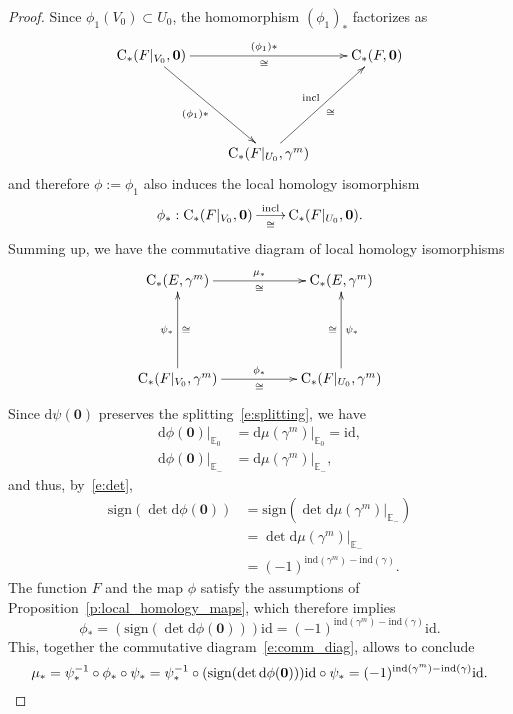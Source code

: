 \documentclass[reqno]{amsart}
\numberwithin{equation}{section}
\theoremstyle{personal}%
\theoremstyle{definition}
\newcommand{\E}{\mathds{E}}
\newcommand{\diff}{\mathrm{d}}
\newcommand{\incl}{\mathrm{incl}}
\newcommand{\Loc}{\mathrm{C}}
\newcommand{\ind}{\mathrm{ind}}
\DeclareRobustCommand{\llongrightarrow}{\relbar\joinrel\relbar\joinrel\rightarrow}
\DeclareMathOperator*{\ttoup}{\llongrightarrow}
\begin{document}
\begin{proof}
Since $\phi_1(V_0)\subset U_0$, the homomorphism $(\phi_1)_*$ factorizes as 
\begin{align*}
\xymatrix{
\Loc_*(F|_{V_0},\bm0)
\ar[rr]^{(\phi_1)*}_{\cong} 
\ar[ddr]_{(\phi_1)*} 
& &
\Loc_*(F,\bm0)\\\\
&\Loc_*(F|_{U_0},\gamma^m)
\ar[uur]^{\incl}_{\cong}
& 
} 
\end{align*}
and therefore $\phi:=\phi_1$ also induces the local homology isomorphism
\begin{align*}
 \phi_*:\Loc_*(F|_{V_0},\bm0)\ttoup_{\cong}^{\incl}\Loc_*(F|_{U_0},\bm0).
\end{align*}
Summing up, we have the commutative diagram of local homology isomorphisms
\begin{equation}\label{e:comm_diag}
\xymatrix{
\Loc_*(E,\gamma^m)
\ar[rr]^{\mu_*}_{\cong} 
& &
\Loc_*(E,\gamma^m)\\\\
\Loc_*(F|_{V_0},\gamma^m)
\ar[rr]^{\phi_*}_{\cong} 
\ar[uu]^{\psi_*}_{\cong}
& &
\Loc_*(F|_{U_0},\gamma^m)
\ar[uu]_{\psi_*}^{\cong}
} 
\end{equation}
Since $\diff\psi(\bm0)$ preserves the splitting~\eqref{e:splitting}, we have
\begin{align*}
\diff\phi(\bm0)|_{\E_0}& =\diff\mu(\gamma^m)|_{\E_0}=\mathrm{id},\\
\diff\phi(\bm0)|_{\E_-}& =\diff\mu(\gamma^m)|_{\E_-},
\end{align*}
and thus, by~\eqref{e:det},
\begin{equation}\label{e:det_diff_phi}
\begin{split}
  \mathrm{sign}(\det\diff\phi(\bm0)) & = \mathrm{sign}(\det\diff\mu(\gamma^m)|_{\E_-})\\
  &=\det\diff\mu(\gamma^m)|_{\E_-}\\
  &=(-1)^{\ind(\gamma^m)-\ind(\gamma)}.
\end{split}
\end{equation}
The function $F$ and the map $\phi$ satisfy the assumptions of Proposition~\ref{p:local_homology_maps}, which therefore implies 
\[\phi_*=(\mathrm{sign}(\det\diff\phi(\bm0)))\mathrm{id}=(-1)^{\ind(\gamma^m)-\ind(\gamma)}\mathrm{id}.\] 
This, together the commutative diagram~\eqref{e:comm_diag}, allows to conclude
\[
\mu_*
=\psi_*^{-1}\circ\phi_*\circ\psi_*
=\psi_*^{-1}\circ(\mathrm{sign}(\det\diff\phi(\bm0)))\mathrm{id}\circ\psi_*=(-1)^{\ind(\gamma^m)-\ind(\gamma)}\mathrm{id}.
\qedhere
\]
\end{proof}
\end{document}
